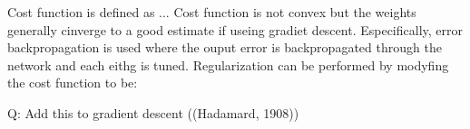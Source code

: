 Cost function is defined as ...
Cost function is not convex but the weights generally cinverge to a good estimate if useing gradiet descent. Especifically, error backpropagation\cite{werbos, 1975} is used where the ouput error is backpropagated through the network and each eithg is tuned. 
Regularization can be performed by modyfing the cost function to be:



Q: Add this to gradient descent ((Hadamard,
1908))
\begin{comment}
describe f(x)

aartificial neural networks
BISHOP ann 
non linea classifiers mad eof layers of neurons or processing untis which make a separte computation and have paramteres which need to be learned. 
When using sigmoids it models the probability of ocurrence of a given event. 
they come from 1960
A n artificial neruon has a set iof inputs representative of the dendrites on treal neurons, an output  that represents the axon and an activation funciton (traditionally a sigmoid function) that represents the computation or preference of a given neuron.
Layers

Trained via backpropagation


side note on language
I will sometimes refer to convolutional netowkrs with no pooling or maxout layers as simple convolutional networks and to those developed more recently simply as convolutional networks. i would also put the parameters of each onvnet to avoid any confusion
also, even thpough Although the convolutinoal nmetworks are an artificial neutral network AND THUS INSPIRED INTITIALYY ON THE BIOLOGY OF NEURAL NETWORKS, on this work I would USE THE NMORE STANDAR NAMES OVER THE BIOINSPIRED ONES, THUS prefer to use more standard names to defoine its parts over the more bioinspireds, thjus, units over neurons and convolutional networks over convolutiona networks. Other authors prefer the more bioinspired terms and both could be find interchangaebky in the literature

\end{comment}




